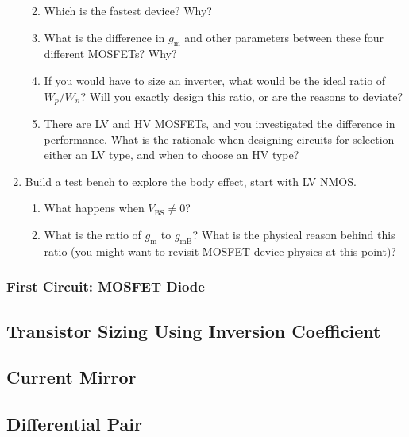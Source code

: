 \documentclass[
  letterpaper,
  DIV=11,
  numbers=noendperiod]{scrartcl}
\providecommand{\tightlist}{%
  \setlength{\itemsep}{0pt}\setlength{\parskip}{0pt}}\usepackage{longtable,booktabs,array}
\begin{document}
\begin{enumerate}
  \begin{enumerate}
  \def\labelenumii{\arabic{enumii}.}
  \tightlist
  \item
    Which is the fastest device? Why?
  \item
    What is the difference in \(g_\mathrm{m}\) and other parameters
    between these four different MOSFETs? Why?
  \item
    If you would have to size an inverter, what would be the ideal ratio
    of \(W_p/W_n\)? Will you exactly design this ratio, or are the
    reasons to deviate?
  \item
    There are LV and HV MOSFETs, and you investigated the difference in
    performance. What is the rationale when designing circuits for
    selection either an LV type, and when to choose an HV type?
  \end{enumerate}
\item
  Build a test bench to explore the body effect, start with LV NMOS.

  \begin{enumerate}
  \def\labelenumii{\arabic{enumii}.}
  \tightlist
  \item
    What happens when \(V_\mathrm{BS} \neq 0\)?
  \item
    What is the ratio of \(g_\mathrm{m}\) to \(g_\mathrm{mB}\)? What is
    the physical reason behind this ratio (you might want to revisit
    MOSFET device physics at this point)?
  \end{enumerate}
\end{enumerate}

\subsubsection{First Circuit: MOSFET Diode}\label{sec-mosfet-diode}

\subsection{Transistor Sizing Using Inversion
Coefficient}\label{transistor-sizing-using-inversion-coefficient}

\subsection{Current Mirror}\label{current-mirror}

\subsection{Differential Pair}\label{differential-pair}
\end{document}
